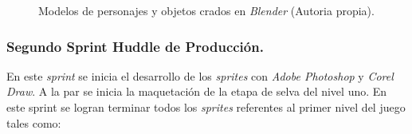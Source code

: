 \begin{figure}[h]
  		\centering
   
 	
		
		
  		\caption{Modelos de personajes y objetos crados en \textit{Blender} (Autoria propia).}
  		\label{fig:Modelos3D}
\end{figure}

\subsubsection{Segundo Sprint Huddle de Producción.}
En este \textit{sprint} se inicia el desarrollo de los \textit{sprites} 
con \textit{Adobe Photoshop} y \textit{Corel Draw}. A la par se inicia la 
maquetación de la etapa de selva del nivel uno. En este sprint se logran 
terminar todos los \textit{sprites} referentes al primer nivel del juego 
tales como: 

